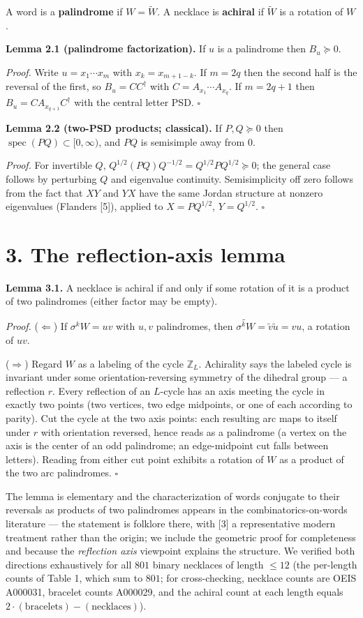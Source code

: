 \documentclass[11pt]{article}
\begin{document}
A word is a \textbf{palindrome} if $W = \widetilde W$.  A necklace is \textbf{achiral} if $\widetilde W$ is a rotation of $W$.

\textbf{Lemma 2.1 (palindrome factorization).}  If $u$ is a palindrome then $B_u \succeq 0$.

\emph{Proof.}  Write $u = x_1\cdots x_m$ with $x_k = x_{m+1-k}$.  If $m = 2q$ then the second half is the reversal of the first, so $B_u = C C^{\dagger}$ with $C = A_{x_1}\cdots A_{x_q}$.  If $m = 2q+1$ then $B_u = C A_{x_{q+1}} C^{\dagger}$ with the central letter PSD.  $\square$

\textbf{Lemma 2.2 (two-PSD products; classical).}  If $P, Q \succeq 0$ then $\operatorname{spec}(PQ) \subset [0, \infty)$, and $PQ$ is semisimple away from $0$.

\emph{Proof.}  For invertible $Q$, $Q^{1/2}(PQ)Q^{-1/2} = Q^{1/2}PQ^{1/2} \succeq 0$; the general case follows by perturbing $Q$ and eigenvalue continuity.  Semisimplicity off zero follows from the fact that $XY$ and $YX$ have the same Jordan structure at nonzero eigenvalues (Flanders [5]), applied to $X = PQ^{1/2}$, $Y = Q^{1/2}$.  $\square$

\section*{3. The reflection-axis lemma}
\textbf{Lemma 3.1.}  A necklace is achiral if and only if some rotation of it is a product of two palindromes (either factor may be empty).

\emph{Proof.}  ($\Leftarrow$)  If $\sigma^k W = uv$ with $u, v$ palindromes, then $\widetilde{\sigma^k W} = \tilde v \tilde u = vu$, a rotation of $uv$.

($\Rightarrow$)  Regard $W$ as a labeling of the cycle $\mathbb Z_L$.  Achirality says the labeled cycle is invariant under some orientation-reversing symmetry of the dihedral group — a reflection $r$.  Every reflection of an $L$-cycle has an axis meeting the cycle in exactly two points (two vertices, two edge midpoints, or one of each according to parity).  Cut the cycle at the two axis points: each resulting arc maps to itself under $r$ with orientation reversed, hence reads as a palindrome (a vertex on the axis is the center of an odd palindrome; an edge-midpoint cut falls between letters).  Reading from either cut point exhibits a rotation of $W$ as a product of the two arc palindromes.  $\square$

The lemma is elementary and the characterization of words conjugate to their reversals as products of two palindromes appears in the combinatorics-on-words literature — the statement is folklore there, with [3] a representative modern treatment rather than the origin; we include the geometric proof for completeness and because the \emph{reflection axis} viewpoint explains the structure.  We verified both directions exhaustively for all $801$ binary necklaces of length $\le 12$ (the per-length counts of Table 1, which sum to $801$; for cross-checking, necklace counts are OEIS A000031, bracelet counts A000029, and the achiral count at each length equals $2\cdot(\text{bracelets}) - (\text{necklaces})$).
\end{document}
